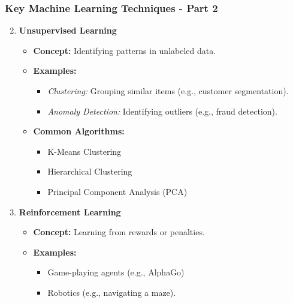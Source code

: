\documentclass[aspectratio=169]{beamer}
\begin{document}
\begin{frame}[fragile]
    \frametitle{Key Machine Learning Techniques - Part 2}
    \begin{enumerate}
        \setcounter{enumi}{1}
        \item \textbf{Unsupervised Learning}
        \begin{itemize}
            \item \textbf{Concept:} Identifying patterns in unlabeled data.
            \item \textbf{Examples:}
            \begin{itemize}
                \item \textit{Clustering:} Grouping similar items (e.g., customer segmentation).
                \item \textit{Anomaly Detection:} Identifying outliers (e.g., fraud detection).
            \end{itemize}
            \item \textbf{Common Algorithms:}
            \begin{itemize}
                \item K-Means Clustering
                \item Hierarchical Clustering
                \item Principal Component Analysis (PCA)
            \end{itemize}
        \end{itemize}
        
        \item \textbf{Reinforcement Learning}
        \begin{itemize}
            \item \textbf{Concept:} Learning from rewards or penalties.
            \item \textbf{Examples:}
            \begin{itemize}
                \item Game-playing agents (e.g., AlphaGo)
                \item Robotics (e.g., navigating a maze).
            \end{itemize}
        \end{itemize}
    \end{enumerate}
\end{frame}
\end{document}
